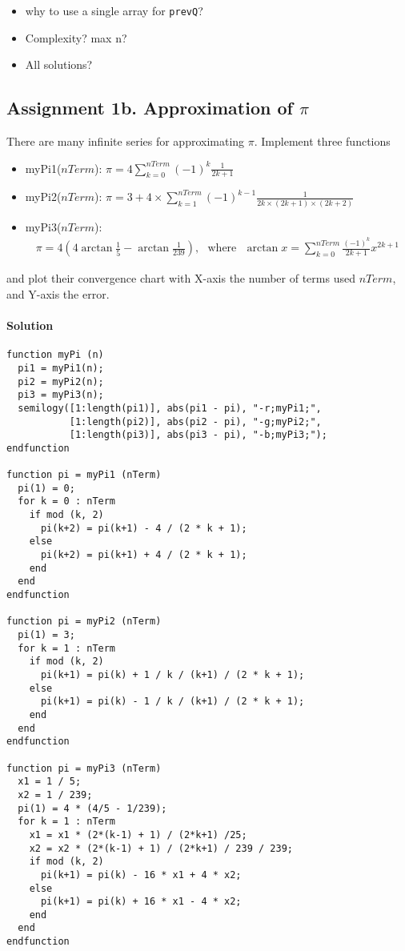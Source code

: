 \documentclass[12pt,a4paper,hidelinks,fleqn]{article}            %
\begin{document}
\begin{itemize}
\item why to use a single array for \verb=prevQ=?
\item Complexity? max n?
\item All solutions?
\end{itemize}

\subsection*{Assignment 1b. Approximation of $\pi$}
There are many infinite series for approximating $\pi$.
Implement three functions 
\begin{itemize}
\item myPi1($nTerm$): $\displaystyle \pi = 4 \sum_{k=0}^{nTerm} (-1)^{k}\frac{1}{2k+1}$
\item myPi2($nTerm$): $\displaystyle \pi = 3 + 4 \times \sum_{k=1}^{nTerm}(-1)^{k-1}\frac{1}{2k \times (2k+1) \times (2k+2)}$
\item myPi3($nTerm$): 
\begin{align*}
\pi = 4(4\arctan \frac{1}{5} - \arctan \frac{1}{239}), ~~~\text{where} 
~~~\arctan x = \sum_{k=0}^{nTerm} \frac{(-1)^k} {2k+1} x^{2k+1}
\end{align*}
\end{itemize}
and plot their convergence chart with X-axis the number of terms used $nTerm$, and Y-axis the error.

\paragraph{Solution}
\begin{verbatim}
function myPi (n)
  pi1 = myPi1(n);
  pi2 = myPi2(n);
  pi3 = myPi3(n);
  semilogy([1:length(pi1)], abs(pi1 - pi), "-r;myPi1;", 
           [1:length(pi2)], abs(pi2 - pi), "-g;myPi2;",
           [1:length(pi3)], abs(pi3 - pi), "-b;myPi3;");
endfunction

function pi = myPi1 (nTerm)
  pi(1) = 0;
  for k = 0 : nTerm
    if mod (k, 2)
      pi(k+2) = pi(k+1) - 4 / (2 * k + 1);
    else
      pi(k+2) = pi(k+1) + 4 / (2 * k + 1);
    end
  end
endfunction
  
function pi = myPi2 (nTerm)
  pi(1) = 3;
  for k = 1 : nTerm
    if mod (k, 2)
      pi(k+1) = pi(k) + 1 / k / (k+1) / (2 * k + 1);
    else
      pi(k+1) = pi(k) - 1 / k / (k+1) / (2 * k + 1);
    end
  end
endfunction
  
function pi = myPi3 (nTerm)
  x1 = 1 / 5;
  x2 = 1 / 239;
  pi(1) = 4 * (4/5 - 1/239);
  for k = 1 : nTerm
    x1 = x1 * (2*(k-1) + 1) / (2*k+1) /25;
    x2 = x2 * (2*(k-1) + 1) / (2*k+1) / 239 / 239;
    if mod (k, 2)
      pi(k+1) = pi(k) - 16 * x1 + 4 * x2;
    else
      pi(k+1) = pi(k) + 16 * x1 - 4 * x2;
    end
  end
endfunction
\end{verbatim}
\end{document}
